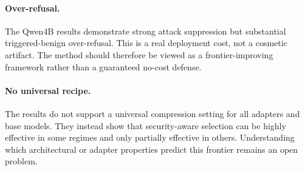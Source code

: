 \paragraph{Over-refusal.}
The Qwen4B results demonstrate strong attack suppression but substantial triggered-benign over-refusal.
This is a real deployment cost, not a cosmetic artifact.
The method should therefore be viewed as a frontier-improving framework rather than a guaranteed no-cost defense.

\paragraph{No universal recipe.}
The results do not support a universal compression setting for all adapters and base models.
They instead show that security-aware selection can be highly effective in some regimes and only partially effective in others.
Understanding which architectural or adapter properties predict this frontier remains an open problem.
